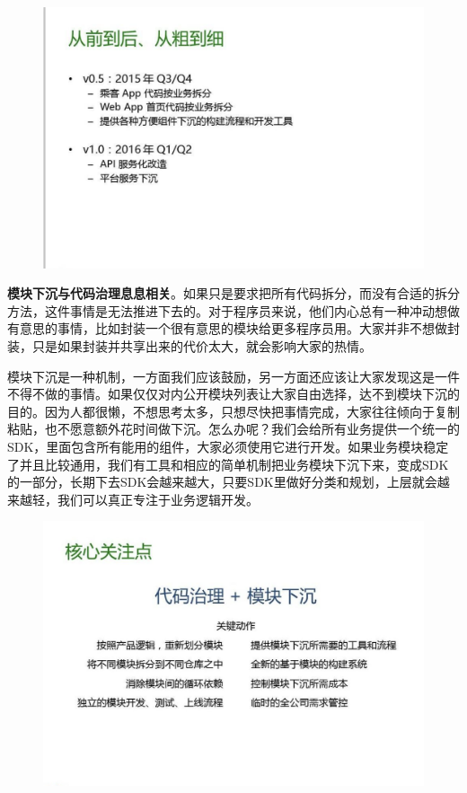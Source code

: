 \documentclass[12pt]{article}
\begin{document}
\begin{figure}[H]
    \centering
    \includegraphics[width=1\textwidth]{fig/DIDI_Reconstruction_9.png}
\end{figure}

\textbf{模块下沉与代码治理息息相关}。如果只是要求把所有代码拆分，而没有合适的拆分方法，这件事情是无法推进下去的。对于程序员来说，他们内心总有一种冲动想做有意思的事情，比如封装一个很有意思的模块给更多程序员用。大家并非不想做封装，只是如果封装并共享出来的代价太大，就会影响大家的热情。

模块下沉是一种机制，一方面我们应该鼓励，另一方面还应该让大家发现这是一件不得不做的事情。如果仅仅对内公开模块列表让大家自由选择，达不到模块下沉的目的。因为人都很懒，不想思考太多，只想尽快把事情完成，大家往往倾向于复制粘贴，也不愿意额外花时间做下沉。怎么办呢？我们会给所有业务提供一个统一的SDK，里面包含所有能用的组件，大家必须使用它进行开发。如果业务模块稳定了并且比较通用，我们有工具和相应的简单机制把业务模块下沉下来，变成SDK的一部分，长期下去SDK会越来越大，只要SDK里做好分类和规划，上层就会越来越轻，我们可以真正专注于业务逻辑开发。

\begin{figure}[H]
    \centering
    \includegraphics[width=1\textwidth]{fig/DIDI_Reconstruction_10.png}
\end{figure}
\end{document}
